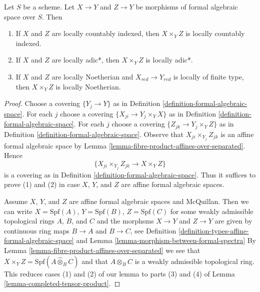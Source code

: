 \begin{lemma}
\label{lemma-types-fibre-products}
Let $S$ be a scheme. Let $X \to Y$ and $Z \to Y$ be
morphisms of formal algebraic space over $S$. Then
\begin{enumerate}
\item If $X$ and $Z$ are locally countably indexed, then $X \times_Y Z$
is locally countably indexed.
\item If $X$ and $Z$ are locally adic*, then $X \times_Y Z$ is
locally adic*.
\item If $X$ and $Z$ are locally Noetherian and $X_{red} \to Y_{red}$
is locally of finite type, then $X \times_Y Z$ is locally Noetherian.
\end{enumerate}
\end{lemma}

\begin{proof}
Choose a covering $\{Y_j \to Y\}$ as in
Definition \ref{definition-formal-algebraic-space}.
For each $j$ choose a covering $\{X_{ji} \to Y_j \times_Y X\}$
as in Definition \ref{definition-formal-algebraic-space}.
For each $j$ choose a covering $\{Z_{jk} \to Y_j \times_Y Z\}$
as in Definition \ref{definition-formal-algebraic-space}.
Observe that $X_{ji} \times_{Y_j} Z_{jk}$ is an
affine formal algebraic space by
Lemma \ref{lemma-fibre-product-affines-over-separated}.
Hence
$$
\{X_{ji} \times_{Y_j} Z_{jk} \to X \times_Y Z\}
$$
is a covering as in Definition \ref{definition-formal-algebraic-space}.
Thus it suffices to prove (1) and (2) in case $X$, $Y$, and $Z$
are affine formal algebraic spaces.

\medskip\noindent
Assume $X$, $Y$, and $Z$ are affine formal algebraic spaces and
McQuillan. Then we can write
$X = \text{Spf}(A)$, $Y = \text{Spf}(B)$, $Z = \text{Spf}(C)$
for some weakly admissible topological rings $A$, $B$, and $C$
and the morphsms $X \to Y$ and $Z \to Y$ are given by
continuous ring maps $B \to A$ and $B \to C$, see
Definition \ref{definition-types-affine-formal-algebraic-space}
and Lemma \ref{lemma-morphism-between-formal-spectra}
By Lemma \ref{lemma-fibre-product-affines-over-separated}
we see that $X \times_Y Z = \text{Spf}(A \widehat{\otimes}_B C)$
and that $A \widehat{\otimes}_B C$ is a weakly admissible topological ring.
This reduces cases (1) and (2) of our lemma to parts (3) and (4) of
Lemma \ref{lemma-completed-tensor-product}.


\end{proof}
